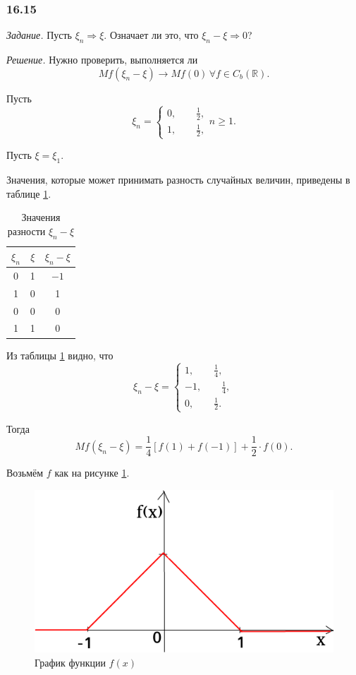 \subsubsection*{16.15}

\textit{Задание.} Пусть $ \xi_n \Rightarrow \xi $.
Означает ли это, что $ \xi_n - \xi \Rightarrow 0$?

\textit{Решение.} Нужно проверить, выполняется ли
$$Mf \left( \xi_n - \xi \right) \rightarrow Mf \left( 0 \right) \,
\forall f \in C_b \left( \mathbb{R} \right).$$

Пусть
$$ \xi_n =
\begin{cases}
0, \qquad \frac{1}{2}, \\
1, \qquad \frac{1}{2},
\end{cases}
n \geq 1.$$

Пусть $ \xi = \xi_1$.

Значения, которые может принимать разность случайных величин, приведены в таблице
\ref{table:difference}.

\begin{table}
\begin{center}
  \begin{tabular}{ | c | c | c | }
    \hline
    $ \xi_n$ & $ \xi $ & $ \xi_n - \xi $ \\ \hline
    0 & 1 & $-1$ \\ \hline
    1 & 0 & 1 \\ \hline
    0 & 0 & 0 \\ \hline
    1 & 1 & 0 \\
    \hline
  \end{tabular}
\caption{Значения разности $ \xi_n - \xi $ \label{table:difference}}
\end{center}
\end{table}

Из таблицы \ref{table:difference} видно, что
$$ \xi_n - \xi =
\begin{cases}
1, \qquad \frac{1}{4}, \\
-1, \qquad \frac{1}{4}, \\
0, \qquad \frac{1}{2}.
\end{cases}$$

Тогда
$$Mf \left( \xi_n - \xi \right) =
\frac{1}{4} \left[ f \left( 1 \right) +
f \left( -1 \right) \right] + \frac{1}{2} \cdot f \left( 0 \right).$$

Возьмём $f$ как на рисунке \ref{fig:1615}.

\begin{figure}[h!]
  \centering
  \includegraphics[width=.4\textwidth]{./pictures/16_15.png}
  \caption{График функции $f \left( x \right) $}
  \label{fig:1615}
\end{figure}

